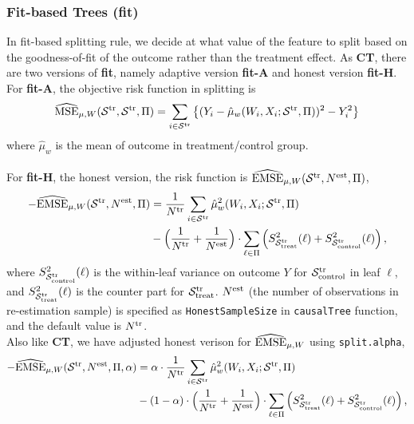 \documentclass[11pt]{article}
\newcommand{\emse}{{\rm EMSE}}
\newcommand{\est}{{\rm est}}
\newcommand{\calp}{{\Pi}}
\newcommand{\cals}{{\cal S}}
\newcommand{\mse}{{\rm MSE}}
\newcommand{\control}{{\rm control}}
\newcommand{\treat}{{\rm treat}}
\newcommand{\train}{{\rm tr}}
\begin{document}
\subsubsection{Fit-based Trees (\textbf{fit})}
In fit-based splitting rule, we decide at what value of the feature to split based on the goodness-of-fit of the outcome rather than the treatment effect. As \textbf{CT}, there are two versions of \textbf{fit}, namely adaptive version \textbf{fit-A} and honest version \textbf{fit-H}.\\
For \textbf{fit-A}, the objective risk function in splitting is 
\[\widehat{\mse}_{\mu, W}(\cals^\train,\cals^\train,\calp) =  \sum_{i\in\cals^\train} \left\{(Y_i-\hat\mu_w(W_i,X_i;\cals^\train,\calp))^2-Y^2_i\right\}\]
where $\hat\mu_w$ is the mean of outcome in treatment/control group.\\
\\
For \textbf{fit-H}, the honest version, the risk function is $\widehat{\emse}_{\mu, W}(\cals^\train, N^\est, \calp)$,
\begin{align*}
-\widehat{\emse}_{\mu, W}(\cals^\train, N^\est, \calp) & = 
\frac{1}{N^\train}\sum_{i\in\cals^\train} \hat\mu_w^2(W_i,X_i;\cals^\train,\calp) \\
& -
\Bigl(\frac{1}{N^\train} + \frac{1}{N^\est}\Bigr)\cdot \sum_{\ell\in\calp}
\left( S^2_{\cals^\train_\treat}(\ell)+ S^2_{\cals^\train_\control}(\ell)\right),
\end{align*}
where $S^2_{\cals^\train_\control}(\ell)$ is the within-leaf variance on outcome $Y$ for $\cals^\train_\control$ in leaf $\ell$, and $S^2_{\cals^\train_\treat}(\ell)$ is the counter part for $\cals^\train_\treat$. $N^\est$ (the number of observations in re-estimation sample) is specified as \texttt{HonestSampleSize} in \texttt{causalTree} function, and the default value is $N^\train$.\\
Also like \textbf{CT}, we have adjusted honest verison for $\widehat{\emse}_{\mu, W}$ using \texttt{split.alpha},
\begin{align*}
-\widehat{\emse}_{\mu, W}(\cals^\train, N^\est,\calp, \alpha) & = 
\alpha \cdot \frac{1}{N^\train}\sum_{i\in\cals^\train} \hat\mu_w^2(W_i,X_i;\cals^\train,\calp) \\
& - (1 - \alpha) \cdot
\Bigl(\frac{1}{N^\train} + \frac{1}{N^\est}\Bigr)\cdot \sum_{\ell\in\calp}
\left( S^2_{\cals^\train_\treat}(\ell)+ S^2_{\cals^\train_\control}(\ell)\right),
\end{align*}
\end{document}
